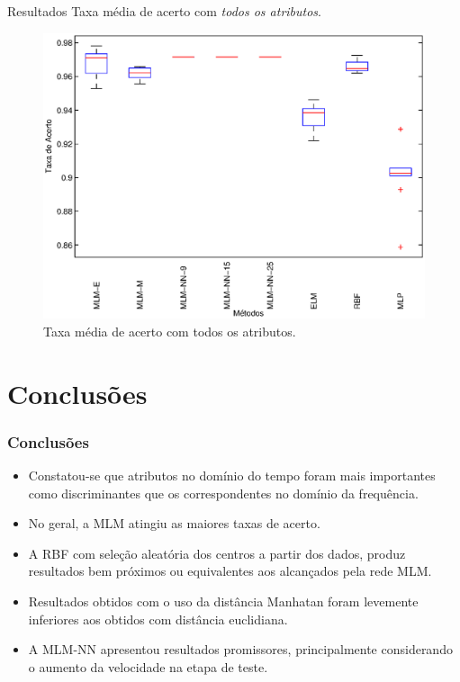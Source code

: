 \documentclass{beamer}
\begin{document}
\begin{frame}{Resultados}
Taxa média de acerto com \textit{todos os atributos}.
\begin{figure}[h!]
\begin{center}
	\includegraphics[scale=0.4]{box_tudo.eps}
	\caption{Taxa média de acerto com todos os atributos.}
	\label{img:box_todos}
	\end{center}
\end{figure}
\end{frame}

\section{Conclusões}
\begin{frame}\frametitle{Conclusões}

\begin{itemize}
		\item Constatou-se que atributos no domínio do tempo foram mais importantes como discriminantes que os correspondentes no domínio da frequência.
		\item No geral, a MLM atingiu as maiores taxas de acerto.
		\item A RBF com seleção aleatória dos centros a partir dos dados, produz resultados bem próximos ou equivalentes aos alcançados pela rede MLM.
		\item Resultados obtidos com o uso da distância Manhatan foram levemente inferiores aos obtidos com distância euclidiana.
		\item A MLM-NN apresentou resultados promissores, principalmente considerando o aumento da velocidade na etapa de teste.
\end{itemize}

\end{frame}
\end{document}
